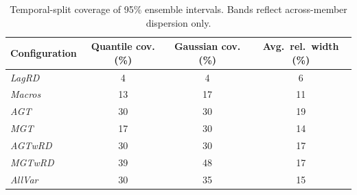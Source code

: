 \begin{table}[!htb]
\centering
\caption{Temporal-split coverage of 95\% ensemble intervals. Bands reflect across-member dispersion only.}
\label{tab:temporal_coverage}
\begin{tabular}{l c c c}
\toprule
Configuration & Quantile cov. (\%) & Gaussian cov. (\%) & Avg.\ rel.\ width (\%) \\
\midrule
\textit{LagRD} & 4 & 4 & 6 \\
\textit{Macros} & 13 & 17 & 11 \\
\textit{AGT} & 30 & 30 & 19 \\
\textit{MGT} & 17 & 30 & 14 \\
\textit{AGTwRD} & 30 & 30 & 17 \\
\textit{MGTwRD} & 39 & 48 & 17 \\
\textit{AllVar} & 30 & 35 & 15 \\
\bottomrule
\end{tabular}
\end{table}

